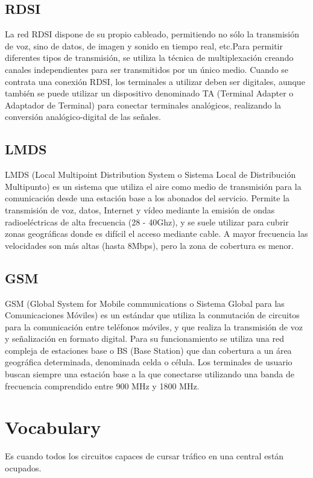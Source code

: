 \documentclass[11pt,fleqn]{book} %
\begin{document}
\subsection{RDSI}
La red RDSI dispone de su propio cableado, permitiendo no sólo la transmisión de voz, sino de datos, de imagen y sonido en tiempo real, etc.Para permitir diferentes tipos de transmisión, se utiliza la técnica de multiplexación creando canales independientes para ser transmitidos por un único medio. Cuando se contrata una conexión RDSI, los terminales a utilizar deben ser digitales, aunque también se puede utilizar un dispositivo denominado TA (Terminal Adapter o Adaptador de Terminal) para conectar terminales analógicos, realizando la conversión analógico-digital de las señales.
\subsection{LMDS}
LMDS (Local Multipoint Distribution System o Sistema Local de Distribución Multipunto) es un sistema que utiliza el aire como medio de transmisión para la comunicación desde una estación base a los abonados del servicio. Permite la transmisión de voz, datos, Internet y vídeo mediante la emisión de ondas radioeléctricas de alta frecuencia (28 - 40Ghz), y se suele utilizar para cubrir zonas geográficas donde es difícil el acceso mediante cable. A mayor frecuencia las velocidades son más altas (hasta 8Mbps), pero la zona de cobertura es menor.
\subsection{GSM}
GSM (Global System for Mobile communications o Sistema Global para las Comunicaciones Móviles) es un estándar que utiliza la conmutación de circuitos para la comunicación entre teléfonos móviles, y que realiza la transmisión de voz y señalización en formato digital. Para su funcionamiento se utiliza una red compleja de estaciones base o BS (Base Station) que dan cobertura a un área geográfica determinada, denominada celda o célula. Los terminales de usuario buscan siempre una estación base a la que conectarse utilizando una banda de frecuencia comprendido entre 900 MHz y 1800 MHz.



\newpage
\section{Vocabulary}
\begin{vocabulary}[Congestión]
Es cuando todos los circuitos capaces de cursar tráfico en una central están ocupados.
\end{vocabulary}
\end{document}
